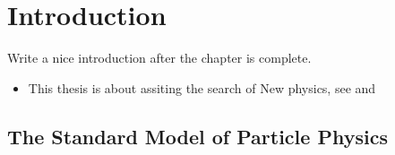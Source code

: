 
\chapter{Introduction}
\label{Introduction}

{\color{red} Write a nice introduction after the chapter is complete.}

\begin{itemize}
  \item   This thesis is about assiting the search of New physics, see   and 
\end{itemize}

%
%

\section{The Standard Model of Particle Physics}
\label{The_Standard_Model}



